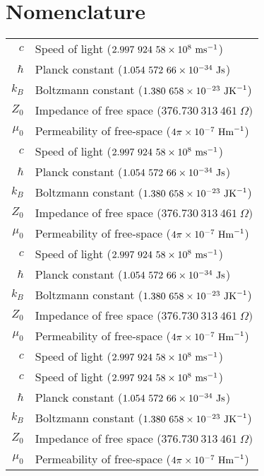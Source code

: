 \chapter*{Nomenclature} 

\begin{longtable}{rl}
$c$ & Speed of light ($2.997\ 924\ 58 \times 10^{8}\ \mbox{ms}^{-1}$) \\
$\hbar$ & Planck constant ($1.054\ 572\ 66\times 10^{-34}\ \mbox{Js}$) \\
$k_B$ & Boltzmann constant  ($1.380\ 658\times 10^{-23}\ \mbox{JK}^{-1} $) \\
$Z_0$ &Impedance of free space  ($376.730\ 313\ 461\ \Omega) $ \\
$\mu_0$ &Permeability of free-space ($4\pi\times 10^{-7}\ \mbox{Hm}^{-1}$) \\
$c$ & Speed of light ($2.997\ 924\ 58 \times 10^{8}\ \mbox{ms}^{-1}$) \\
$\hbar$ & Planck constant ($1.054\ 572\ 66\times 10^{-34}\ \mbox{Js}$) \\
$k_B$ & Boltzmann constant  ($1.380\ 658\times 10^{-23}\ \mbox{JK}^{-1} $) \\
$Z_0$ &Impedance of free space  ($376.730\ 313\ 461\ \Omega) $ \\
$\mu_0$ &Permeability of free-space ($4\pi\times 10^{-7}\ \mbox{Hm}^{-1}$) \\
$c$ & Speed of light ($2.997\ 924\ 58 \times 10^{8}\ \mbox{ms}^{-1}$) \\
$\hbar$ & Planck constant ($1.054\ 572\ 66\times 10^{-34}\ \mbox{Js}$) \\
$k_B$ & Boltzmann constant  ($1.380\ 658\times 10^{-23}\ \mbox{JK}^{-1} $) \\
$Z_0$ &Impedance of free space  ($376.730\ 313\ 461\ \Omega) $ \\
$\mu_0$ &Permeability of free-space ($4\pi\times 10^{-7}\ \mbox{Hm}^{-1}$) \\
$c$ & Speed of light ($2.997\ 924\ 58 \times 10^{8}\ \mbox{ms}^{-1}$) \\
$c$ & Speed of light ($2.997\ 924\ 58 \times 10^{8}\ \mbox{ms}^{-1}$) \\
$\hbar$ & Planck constant ($1.054\ 572\ 66\times 10^{-34}\ \mbox{Js}$) \\
$k_B$ & Boltzmann constant  ($1.380\ 658\times 10^{-23}\ \mbox{JK}^{-1} $) \\
$Z_0$ &Impedance of free space  ($376.730\ 313\ 461\ \Omega) $ \\
$\mu_0$ &Permeability of free-space ($4\pi\times 10^{-7}\ \mbox{Hm}^{-1}$) \\

\end{longtable}
